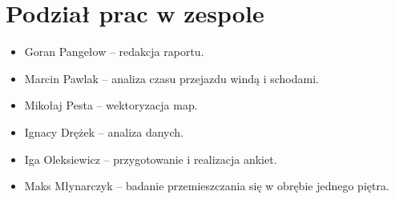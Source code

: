 \documentclass[14pt,a4paper]{extarticle}
\begin{document}
\section{Podział prac w zespole}

\begin{itemize}
    \item Goran Pangełow -- redakcja raportu.
    \item Marcin Pawlak -- analiza czasu przejazdu windą i schodami.
    \item Mikołaj Pesta -- wektoryzacja map.
    \item Ignacy Drężek -- analiza danych.
    \item Iga Oleksiewicz -- przygotowanie i realizacja ankiet.
    \item Maks Młynarczyk -- badanie przemieszczania się w obrębie jednego piętra.
\end{itemize}
\end{document}
